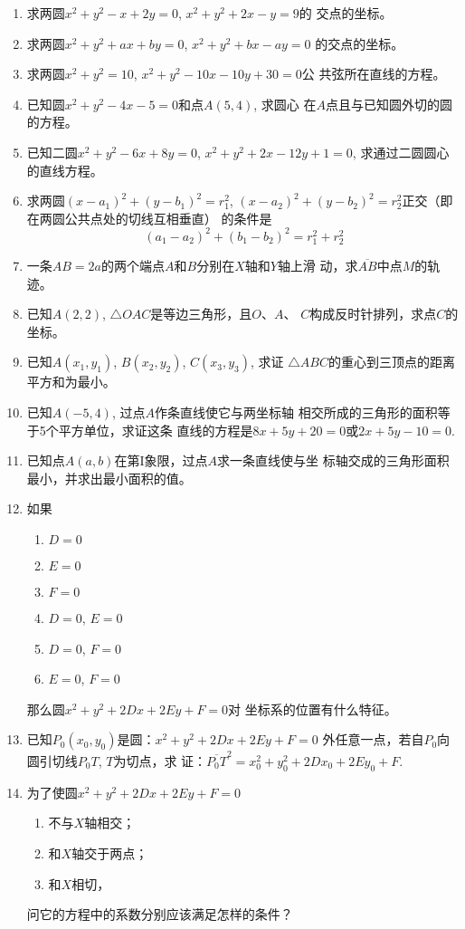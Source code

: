 \begin{enumerate}
\item 求两圆$x^2+y^2-x+2y=0$, $x^2+y^2+2x-y=9$的
交点的坐标。
\item 求两圆$x^2+y^2+ax+by=0$, $x^2+y^2+bx-ay=0$
的交点的坐标。
\item 求两圆$x^2+y^2=10$, $x^2+y^2-10x-10y+30=0$公
共弦所在直线的方程。
\item 已知圆$x^2+y^2-4x-5=0$和点$A(5,4)$, 求圆心
在$A$点且与已知圆外切的圆的方程。
\item 已知二圆$x^2+y^2-6x+8y=0$, $x^2+y^2+2x-12y
+1=0$, 求通过二圆圆心的直线方程。
\item 求两圆$(x-a_1)^2+(y-b_1)^2=r^2_1$, $(x-a_2)^2+(y-
b_2)^2=r^2_2$正交（即在两圆公共点处的切线互相垂直）
的条件是
\[(a_1-a_2)^2+(b_1-b_2)^2=r_1^2+r_2^2\]
\item 一条$AB=2a$的两个端点$A$和$B$分别在$X$轴和$Y$轴上滑
动，求$\overline{AB}$中点$M$的轨迹。
\item 已知$A(2,2)$, $\triangle OAC$是等边三角形，且$O$、$A$、
$C$构成反时针排列，求点$C$的坐标。
\item 已知$A(x_1,y_1)$, $B(x_2,y_2)$, $C(x_3,y_3)$, 求证
$\triangle ABC$的重心到三顶点的距离平方和为最小。
\item 已知$A(-5,4)$, 过点$A$作条直线使它与两坐标轴
相交所成的三角形的面积等于5个平方单位，求证这条
直线的方程是$8x+5y+20=0$或$2x+5y-10=0$.
\item 已知点$A(a,b)$在第I象限，过点$A$求一条直线使与坐
标轴交成的三角形面积最小，并求出最小面积的值。

\item 如果
\begin{multicols}{2}
    \begin{enumerate}
        \item $D=0$
        \item $E=0$
        \item $F=0$
        \item $D=0$, $E=0$
        \item $D=0$, $F=0$
        \item $E=0$, $F=0$
    \end{enumerate}
\end{multicols}
那么圆$x^2+y^2+2Dx+2Ey+F=0$对
坐标系的位置有什么特征。
\item 已知$P_0(x_0,y_0)$是圆：$x^2+y^2+2Dx+2Ey+F=0$
外任意一点，若自$P_0$向圆引切线$P_0T$, $T$为切点，求
证：$\overline{P_0T}^2=x_0^2+y_0^2+2Dx_0+2Ey_0+F$.
\item 为了使圆$x^2+y^2+2Dx+2Ey+F=0$
\begin{enumerate}
\item 不与$X$轴相交；    
\item 和$X$轴交于两点；    
\item 和$X$相切，
\end{enumerate}
问它的方程中的系数分别应该满足怎样的条件？


\end{enumerate}
